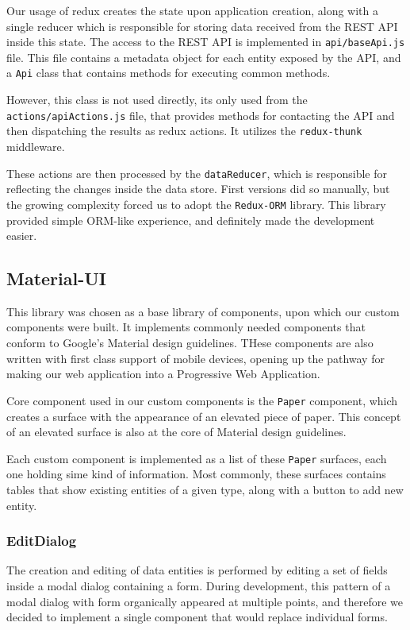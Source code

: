Our usage of redux creates the state upon application creation, along with a single reducer which is responsible
for storing data received from the REST API inside this state. The access to the REST API is implemented in
\verb|api/baseApi.js| file. This file contains a metadata object for each entity exposed by the API, and
a \verb|Api| class that contains methods for executing common methods.

However, this class is not used directly, its only used from the \verb|actions/apiActions.js| file, that
provides methods for contacting the API and then dispatching the results as redux actions. It utilizes
the \verb|redux-thunk| middleware.

These actions are then processed by the \verb|dataReducer|, which is responsible for reflecting the changes inside the
data store. First versions did so manually, but the growing complexity forced us to adopt the \verb|Redux-ORM| library.
This library provided simple ORM-like experience, and definitely made the development easier.

\subsection{Material-UI}
This library was chosen as a base library of components, upon which our custom components were built.
It implements commonly needed components that conform to Google's Material design guidelines.
THese components are also written with first class support of mobile devices, opening up the pathway for
making our web application into a Progressive Web Application.

Core component used in our custom components is the \verb|Paper| component, which creates a surface
with the appearance of an elevated piece of paper. This concept of an elevated surface is also at the core of
Material design guidelines.

Each custom component is implemented as a list of these \verb|Paper| surfaces, each one holding sime kind of information.
Most commonly, these surfaces contains tables that show existing entities of a given type, along with a button to add new entity.

\subsubsection{EditDialog}
The creation and editing of data entities is performed by editing a set of fields inside a modal dialog containing a
form. During development, this pattern of a modal dialog with form organically appeared at multiple points, and therefore we decided to implement a
single component that would replace individual forms.

